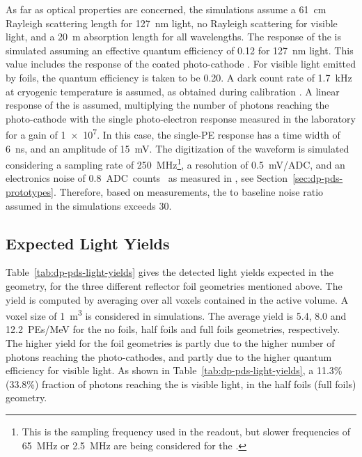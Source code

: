 As far as  optical properties are concerned, the simulations assume a \SI{61}{\cm} Rayleigh scattering length for \SI{127}{\nm} light, no Rayleigh scattering for visible light, and a \SI{20}{\m} absorption length for all wavelengths. The response of the  is simulated assuming an effective quantum efficiency of \num{0.12} for \SI{127}{\nm} light. This value includes the  response of the coated photo-cathode \cite{Bonesini:2018ubd}. For visible light emitted by  foils, the  quantum efficiency is taken to be \num{0.20}. A dark count rate of \SI{1.7}{\kilo\hertz} at cryogenic temperature is assumed, as obtained during   calibration \cite{Belver:2018erf}. A linear response of the  is assumed, multiplying the number of photons reaching the photo-cathode with the single photo-electron response measured in the laboratory for a gain of \num{1e7}. In this case, the single-PE response has a time width of \SI{6}{\nano\s}, and an amplitude of \SI{15}{mV}. The digitization of the waveform is simulated considering a sampling rate of \SI{250}{MHz}\footnote{This is the sampling frequency used in the  readout, but slower frequencies of \SI{65}{MHz} or \SI{2.5}{MHz} are being considered for the  .}, a resolution of \SI{0.5}{mV/ADC}, and an electronics noise of \SI{0.8}{ADC counts } as measured in , see Section~\ref{sec:dp-pds-prototypes}. Therefore, based on  measurements, the  to baseline noise  ratio assumed in the simulations exceeds \num{30}.


\subsection{Expected Light Yields}
\label{subsec:dp-pds-simulation_yields}

Table~\ref{tab:dp-pds-light-yields} gives the detected light yields expected in the \dune {} geometry, for the three different  reflector foil geometries mentioned above. The yield is computed by averaging over all \lar voxels contained in the  active volume. A voxel size of \SI{1}{\m^3} is considered in   simulations. The average yield is \num{5.4}, \num{8.0} and \SI{12.2}{PEs/MeV} for the no foils, half foils and full foils geometries, respectively. The higher yield for the foil geometries is partly due to the higher number of photons reaching the  photo-cathodes, and partly due to the higher  quantum efficiency for visible light. As shown in Table~\ref{tab:dp-pds-light-yields}, a 11.3\% (33.8\%) fraction of photons reaching the  is  visible light, in the half foils (full foils) geometry.

